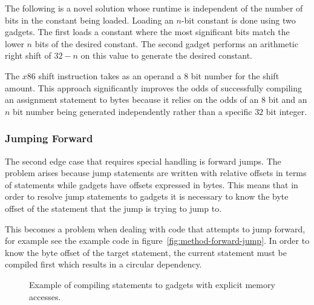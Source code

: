     The following is a novel solution whose runtime is independent of the number
    of bits in the constant being loaded. Loading an $n$-bit constant is done
    using two gadgets. The first loads a constant where the most significant
    bits match the lower $n$ bits of the desired constant. The second gadget
    performs an arithmetic right shift of $32-n$ on this value to generate the
    desired constant.

    The $x86$ shift instruction takes as an operand a $8$ bit number for the
    shift amount. This approach significantly improves the odds of successfully
    compiling an assignment statement to bytes because it relies on the odds of
    an $8$ bit and an $n$ bit number being generated independently rather than a
    specific $32$ bit integer.

    \subsubsection{Jumping Forward}

    The second edge case that requires special handling is forward jumps. The
    problem arises because jump statements are written with relative offsets in
    terms of statements while gadgets have offsets expressed in bytes. This
    means that in order to resolve jump statements to gadgets it is necessary to
    know the byte offset of the statement that the jump is trying to jump to.

    This becomes a problem when dealing with code that attempts to jump forward,
    for example see the example code in figure~\ref{fig:method-forward-jump}.
    In order to know the byte offset of the target statement, the current
    statement must be compiled first which results in a circular dependency.

    \begin{figure}
        \centering
        \caption{Example of compiling statements to gadgets with explicit memory
        accesses.}
        \label{fig:method-direct-to-gadget}
    \end{figure}

